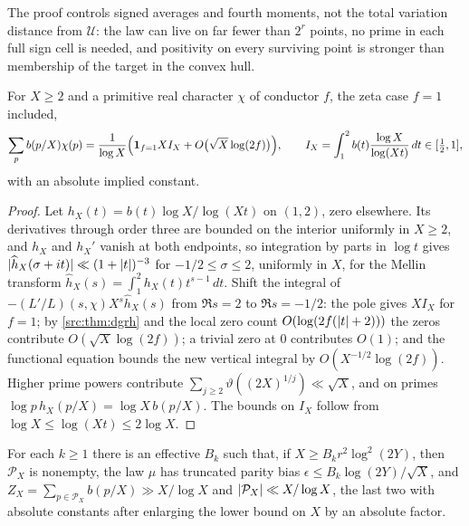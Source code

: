 The proof controls signed averages and fourth moments, not the total variation distance from $\mathcal U$:
the law can live on far fewer than $2^r$ points, no prime in each full sign cell is needed, and positivity on
every surviving point is stronger than membership of the target in the convex hull.

\begin{lemma}\label{dir:lem:bump}
For $X\ge2$ and a primitive real character $\chi$ of conductor $f$, the zeta case $f=1$ included,
\[
 \sum_pb(p/X)\chi(p)=\frac1{\log X}\Bigl(\mathbf 1_{f=1}XI_X+O\bigl(\sqrt X\log(2f)\bigr)\Bigr),\qquad
 I_X=\int_1^2b(t)\frac{\log X}{\log(Xt)}\,dt\in[\tfrac12,1],
\]
with an absolute implied constant.
\end{lemma}

\begin{proof}
Let $h_X(t)=b(t)\log X/\log(Xt)$ on $(1,2)$, zero elsewhere. Its derivatives through order three are bounded
on the interior uniformly in $X\ge2$, and $h_X$ and $h_X'$ vanish at both endpoints, so integration by parts in
$\log t$ gives $\lvert\widehat h_X(\sigma+it)\rvert\ll(1+\lvert t\rvert)^{-3}$ for $-1/2\le\sigma\le2$, uniformly in $X$, for
the Mellin transform $\widehat h_X(s)=\int_1^2h_X(t)t^{s-1}\,dt$. Shift the integral of
$-(L'/L)(s,\chi)X^s\widehat h_X(s)$ from $\Re s=2$ to $\Re s=-1/2$: the pole gives $XI_X$ for $f=1$; by
\cref{src:thm:dgrh} and the local zero count $O(\log(2f(\lvert t\rvert+2)))$ the zeros contribute $O(\sqrt X\log(2f))$; a
trivial zero at $0$ contributes $O(1)$; and the functional equation bounds the new vertical integral by
$O(X^{-1/2}\log(2f))$. Higher prime powers contribute $\sum_{j\ge2}\vartheta((2X)^{1/j})\ll\sqrt X$, and on
primes $\log p\,h_X(p/X)=\log X\,b(p/X)$. The bounds on $I_X$ follow from $\log X\le\log(Xt)\le2\log X$.
\end{proof}

\begin{lemma}\label{dir:lem:primebias}
For each $k\ge1$ there is an effective $B_k$ such that, if $X\ge B_kr^2\log^2(2Y)$, then $\mathcal P_X$ is
nonempty, the law $\mu$ has truncated parity bias $\epsilon\le B_k\log(2Y)/\sqrt X$, and
$Z_X=\sum_{p\in\mathcal P_X}b(p/X)\gg X/\log X$ and $\lvert\mathcal P_X\rvert\ll X/\log X$, the last two with absolute
constants after enlarging the lower bound on $X$ by an absolute factor.
\end{lemma}

